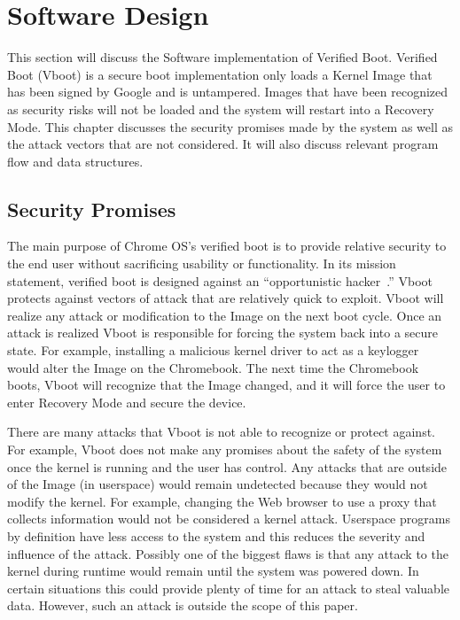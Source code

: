 \chapter{Software Design}

This section will discuss the Software implementation of Verified
Boot. 
Verified Boot (Vboot) is a secure boot implementation only loads a
Kernel Image that has been signed by Google and is untampered.
Images that have been recognized as security risks will not be loaded and the system will restart into a Recovery Mode.
This chapter discusses the security promises made by the system as well
as the attack vectors that are not considered.
It will also discuss relevant program flow and data structures.

\section{Security Promises}

The main purpose of Chrome OS's verified boot is to provide relative security to the end user without sacrificing usability or functionality. 
In its mission statement, verified boot is designed against an ``opportunistic hacker~\cite{vboot-design-doc}.''
Vboot protects against vectors of attack that are relatively quick to exploit.
Vboot will realize any attack or modification to the Image on the next boot cycle.
Once an attack is realized Vboot is responsible for forcing the system back into
a secure state.
For example, installing a malicious kernel driver to act as a keylogger would
alter the Image on the Chromebook.
The next time the Chromebook boots, Vboot will recognize that the Image changed,
and it will force the user to enter Recovery Mode and secure the device. 

There are many attacks that Vboot is not able to recognize or protect against.
For example, Vboot does not make any promises about the safety of the system once the kernel is running and the user has control. 
Any attacks that are outside of the Image (in userspace) would remain
undetected because they would not modify the kernel.
For example, changing the Web browser to use a proxy that collects information
would not be considered a kernel attack.
Userspace programs by definition have less access to the system and this reduces the severity and influence of the attack.
Possibly one of the biggest flaws is that any attack to the kernel during
runtime would remain until the system was powered down.
In certain situations this could provide plenty of time for an attack to steal valuable data.
However, such an attack is outside the scope of this paper.

